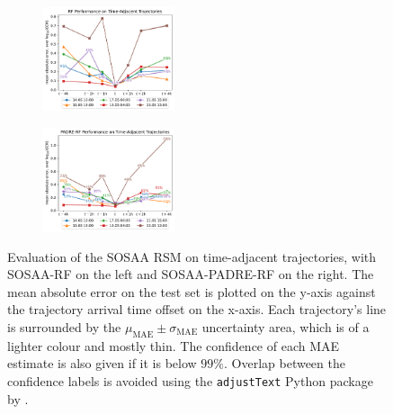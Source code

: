 \begin{figure}[H]
    \centering
    \begin{subfigure}
        \centering
        \includegraphics[width=0.425\textwidth]{evaluation/figures/results/temporal-generalisation-rf.pdf}
    \end{subfigure}
    \begin{subfigure}
        \centering
        \includegraphics[width=0.425\textwidth]{evaluation/figures/results/temporal-generalisation-padre-rf.pdf}
    \end{subfigure}

    \caption[Evaluation of the SOSAA RSM on Time-Adjacent Trajectories]{Evaluation of the SOSAA RSM on time-adjacent trajectories, with SOSAA-RF on the left and SOSAA-PADRE-RF on the right. The mean absolute error on the test set is plotted on the y-axis against the trajectory arrival time offset on the x-axis. Each trajectory's line is surrounded by the $\mu_{\text{MAE}} \pm \sigma_{\text{MAE}}$ uncertainty area, which is of a lighter colour and mostly thin. The confidence of each MAE estimate is also given if it is below $99\%$. Overlap between the confidence labels is avoided using the \texttt{adjustText} Python package by \textcite{matplotlib-adjust-text-2023}.}
    \label{fig:sosaa-rsm-temporal}
\end{figure}

